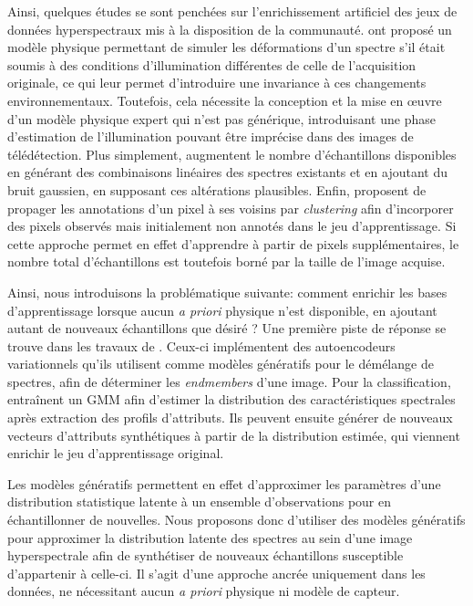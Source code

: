 Ainsi, quelques études se sont penchées sur l'enrichissement artificiel des jeux de données hyperspectraux mis à la disposition de la communauté. \citet{windrim_hyperspectral_2016} ont proposé un modèle physique permettant de simuler les déformations d'un spectre s'il était soumis à des conditions d'illumination différentes de celle de l'acquisition originale, ce qui leur permet d'introduire une invariance à ces changements environnementaux. Toutefois, cela nécessite la conception et la mise en \oe{}uvre d'un modèle physique expert qui n'est pas générique, introduisant une phase d'estimation de l'illumination pouvant être imprécise dans des images de télédétection. Plus simplement, \citet{chen_deep_2016} augmentent le nombre d'échantillons disponibles en générant des combinaisons linéaires des spectres existants et en ajoutant du bruit gaussien, en supposant ces altérations plausibles. Enfin, \citet{acquarelli_convolutional_2017} proposent de propager les annotations d'un pixel à ses voisins par \emph{clustering} afin d'incorporer des pixels observés mais initialement non annotés dans le jeu d'apprentissage. Si cette approche permet en effet d'apprendre à partir de pixels supplémentaires, le nombre total d'échantillons est toutefois borné par la taille de l'image acquise.

Ainsi, nous introduisons la problématique suivante: comment enrichir les bases d'apprentissage lorsque aucun \emph{a priori} physique n'est disponible, en ajoutant autant de nouveaux échantillons que désiré ? Une première piste de réponse se trouve dans les travaux de \citet{gemp_inverting_2017}. Ceux-ci implémentent des autoencodeurs variationnels qu'ils utilisent comme modèles génératifs pour le démélange de spectres, afin de déterminer les \emph{endmembers} d'une image. Pour la classification,~\citet{davari_gmm-based_2018} entraînent un \gls{GMM} afin d'estimer la distribution des caractéristiques spectrales après extraction des profils d'attributs. Ils peuvent ensuite générer de nouveaux vecteurs d'attributs synthétiques à partir de la distribution estimée, qui viennent enrichir le jeu d'apprentissage original.

Les modèles génératifs permettent en effet d'approximer les paramètres d'une distribution statistique latente à un ensemble d'observations pour en échantillonner de nouvelles. Nous proposons donc d’utiliser des modèles génératifs pour approximer la distribution latente des spectres au sein d'une image hyperspectrale afin de synthétiser de nouveaux échantillons susceptible d'appartenir à celle-ci. Il s'agit d'une approche ancrée uniquement dans les données, ne nécessitant aucun \emph{a priori} physique ni modèle de capteur.

